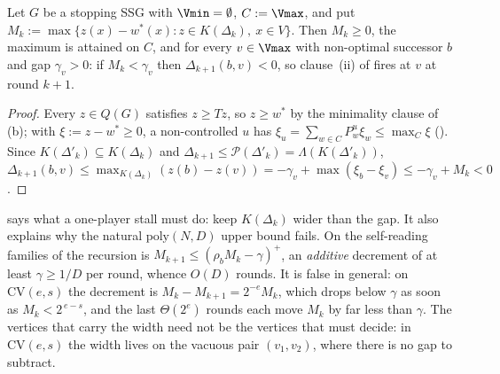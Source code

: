 \begin{lemma}\label{lem:fd-narrow}
Let $G$ be a stopping SSG with $\Vmin=\emptyset$, $C:=\Vmax$, and put
$M_k:=\max\{z(x)-w^\ast(x):z\in K(\Delta_k),\ x\in V\}$. Then $M_k\ge0$, the
maximum is attained on $C$, and for every $v\in\Vmax$ with non-optimal
successor $b$ and gap $\gamma_v>0$: if $M_k<\gamma_v$ then
$\Delta_{k+1}(b,v)<0$, so clause~(ii) of  fires at $v$
at round $k+1$.
\end{lemma}

\begin{proof}
Every $z\in Q(G)$ satisfies $z\ge Tz$, so $z\ge w^\ast$ by the minimality
clause of (b); with $\xi:=z-w^\ast\ge0$, a non-controlled
$u$ has $\xi_u=\sum_{w\in C}P^{u}_w\xi_w\le\max_C\xi$
(). Since $K(\Delta'_k)\subseteq K(\Delta_k)$ and
$\Delta_{k+1}\le\mathcal P(\Delta'_k)=\Lambda(K(\Delta'_k))$,
$\Delta_{k+1}(b,v)\le\max_{K(\Delta_k)}(z(b)-z(v))=-\gamma_v+\max(\xi_b-\xi_v)
\le-\gamma_v+M_k<0$.
\end{proof}

\begin{remark}\label{rem:fd-narrow}
 says what a one-player stall must do: keep $K(\Delta_k)$
wider than the gap. It also explains why the natural $\mathrm{poly}(N,D)$
upper bound fails. On the self-reading families of  the
recursion is $M_{k+1}\le(\rho_bM_k-\gamma)^{+}$, an \emph{additive} decrement
of at least $\gamma\ge1/D$ per round, whence $O(D)$ rounds. It is false in
general: on $\mathrm{CV}(e,s)$ the decrement is $M_k-M_{k+1}=2^{-e}M_k$, which
drops below $\gamma$ as soon as $M_k<2^{\,e-s}$, and the last $\Theta(2^{e})$
rounds each move $M_k$ by far less than $\gamma$. The vertices that carry the
width need not be the vertices that must decide: in $\mathrm{CV}(e,s)$ the
width lives on the vacuous pair $(v_1,v_2)$, where there is no gap to subtract.
\end{remark}

